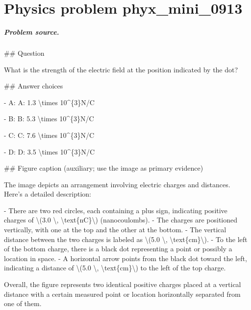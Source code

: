 
\chapter{Physics problem phyx\_mini\_0913}
\label{ch:PhyXMiniProblems_problem_phyx_mini_0913}

\paragraph{Problem source.}
\#\# Question

What is the strength of the electric field at the position indicated by the dot?

\#\# Answer choices

- A: A: 1.3 \textbackslash{}times 10\textasciicircum{}\{3\}N/C

- B: B: 5.3 \textbackslash{}times 10\textasciicircum{}\{3\}N/C

- C: C: 7.6 \textbackslash{}times 10\textasciicircum{}\{3\}N/C

- D: D: 3.5 \textbackslash{}times 10\textasciicircum{}\{3\}N/C

\#\# Figure caption (auxiliary; use the image as primary evidence)

The image depicts an arrangement involving electric charges and distances. Here's a detailed description:

- There are two red circles, each containing a plus sign, indicating positive charges of \textbackslash{}(3.0 \textbackslash{}, \textbackslash{}text\{nC\}\textbackslash{}) (nanocoulombs).
- The charges are positioned vertically, with one at the top and the other at the bottom.
- The vertical distance between the two charges is labeled as \textbackslash{}(5.0 \textbackslash{}, \textbackslash{}text\{cm\}\textbackslash{}).
- To the left of the bottom charge, there is a black dot representing a point or possibly a location in space.
- A horizontal arrow points from the black dot toward the left, indicating a distance of \textbackslash{}(5.0 \textbackslash{}, \textbackslash{}text\{cm\}\textbackslash{}) to the left of the top charge.

Overall, the figure represents two identical positive charges placed at a vertical distance with a certain measured point or location horizontally separated from one of them.

